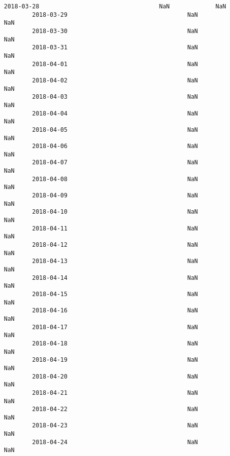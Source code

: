 \documentclass[11pt]{article}
\begin{document}
\begin{Verbatim}[commandchars=\\\{\}]
        2018-03-28                                  NaN             NaN   
        2018-03-29                                  NaN             NaN   
        2018-03-30                                  NaN             NaN   
        2018-03-31                                  NaN             NaN   
        2018-04-01                                  NaN             NaN   
        2018-04-02                                  NaN             NaN   
        2018-04-03                                  NaN             NaN   
        2018-04-04                                  NaN             NaN   
        2018-04-05                                  NaN             NaN   
        2018-04-06                                  NaN             NaN   
        2018-04-07                                  NaN             NaN   
        2018-04-08                                  NaN             NaN   
        2018-04-09                                  NaN             NaN   
        2018-04-10                                  NaN             NaN   
        2018-04-11                                  NaN             NaN   
        2018-04-12                                  NaN             NaN   
        2018-04-13                                  NaN             NaN   
        2018-04-14                                  NaN             NaN   
        2018-04-15                                  NaN             NaN   
        2018-04-16                                  NaN             NaN   
        2018-04-17                                  NaN             NaN   
        2018-04-18                                  NaN             NaN   
        2018-04-19                                  NaN             NaN   
        2018-04-20                                  NaN             NaN   
        2018-04-21                                  NaN             NaN   
        2018-04-22                                  NaN             NaN   
        2018-04-23                                  NaN             NaN   
        2018-04-24                                  NaN             NaN   
        

\end{Verbatim}
\end{document}
